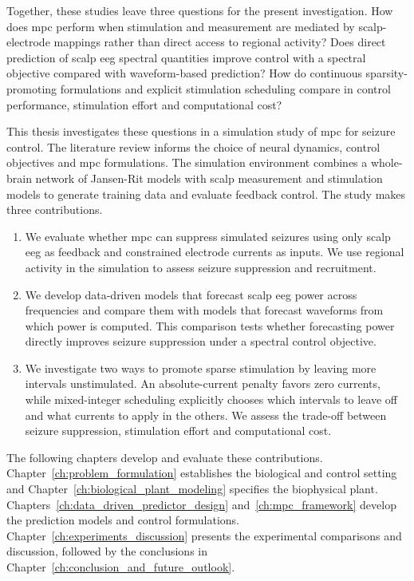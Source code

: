 Together, these studies leave three questions for the present investigation.
How does \ac{mpc} perform when stimulation and measurement are mediated by scalp-electrode mappings rather than direct access to regional activity?
Does direct prediction of scalp \ac{eeg} spectral quantities improve control with a spectral objective compared with waveform-based prediction?
How do continuous sparsity-promoting formulations and explicit stimulation scheduling compare in control performance, stimulation effort and computational cost?

This thesis investigates these questions in a simulation study of \ac{mpc} for seizure control.
The literature review informs the choice of neural dynamics, control objectives and \ac{mpc} formulations.
The simulation environment combines a whole-brain network of Jansen-Rit models with scalp measurement and stimulation models to generate training data and evaluate feedback control.
The study makes three contributions.

\begin{enumerate}
    \item We evaluate whether \ac{mpc} can suppress simulated seizures using only scalp \ac{eeg} as feedback and constrained electrode currents as inputs.
          We use regional activity in the simulation to assess seizure suppression and recruitment.
    \item We develop data-driven models that forecast scalp \ac{eeg} power across frequencies and compare them with models that forecast waveforms from which power is computed.
          This comparison tests whether forecasting power directly improves seizure suppression under a spectral control objective.
    \item We investigate two ways to promote sparse stimulation by leaving more intervals unstimulated.
          An absolute-current penalty favors zero currents, while mixed-integer scheduling explicitly chooses which intervals to leave off and what currents to apply in the others.
          We assess the trade-off between seizure suppression, stimulation effort and computational cost.
\end{enumerate}

The following chapters develop and evaluate these contributions.
Chapter~\ref{ch:problem_formulation} establishes the biological and control setting and Chapter~\ref{ch:biological_plant_modeling} specifies the biophysical plant.
Chapters~\ref{ch:data_driven_predictor_design} and~\ref{ch:mpc_framework} develop the prediction models and control formulations.
Chapter~\ref{ch:experiments_discussion} presents the experimental comparisons and discussion, followed by the conclusions in Chapter~\ref{ch:conclusion_and_future_outlook}.
